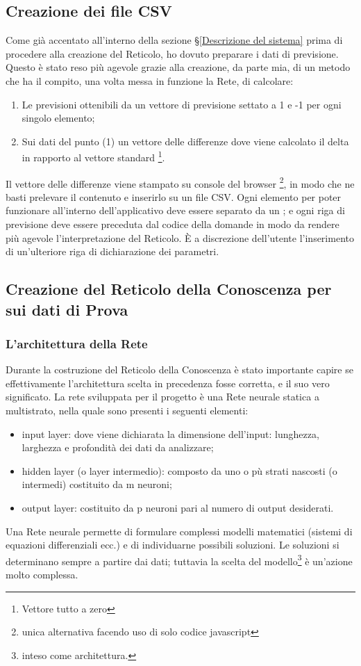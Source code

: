 \subsection{Creazione dei file CSV}
\label{Creazione dei file CSV}
Come gi\`a accentato all'interno della sezione §\ref{Descrizione del sistema} prima di procedere alla creazione del Reticolo, ho dovuto preparare i dati di previsione. Questo \`e stato reso pi\`u agevole grazie alla creazione, da parte mia, di un metodo che ha il compito, una volta messa in funzione la Rete, di calcolare:
\begin{enumerate}
\item Le previsioni ottenibili da un vettore di previsione settato a 1 e -1 per ogni singolo elemento;
\item Sui dati del punto (1) un vettore delle differenze dove viene calcolato il delta in rapporto al vettore standard \footnote{Vettore tutto a zero}.
\end{enumerate}
\noindent
Il vettore delle differenze viene stampato su console del browser \footnote{unica alternativa facendo uso di solo codice javascript}, in modo che ne basti prelevare il contenuto e inserirlo su un file CSV. Ogni elemento per poter funzionare all'interno dell'applicativo deve essere separato da un ; e ogni riga di previsione deve essere preceduta dal codice della domande in modo da rendere pi\`u agevole l'interpretazione del Reticolo. \`E a discrezione dell'utente l'inserimento di un'ulteriore riga di dichiarazione dei parametri.

\subsection{Creazione del Reticolo della Conoscenza per sui dati di Prova}
\label{Creazione del Reticolo della Conoscenza per sui dati di Prova}

\subsubsection{L'architettura della Rete}
\label{L'architettura della Rete}
Durante la costruzione del Reticolo della Conoscenza \`e stato importante capire se effettivamente l'architettura scelta in precedenza fosse corretta, e il suo vero significato. La rete sviluppata per il progetto \`e una Rete neurale statica a multistrato, nella quale sono presenti i seguenti elementi:
\begin{itemize}
\item input layer: dove viene dichiarata la dimensione dell'input: lunghezza, larghezza e profondit\`a dei dati da analizzare;
\item hidden layer (o layer intermedio): composto da uno o p\`u strati nascosti (o intermedi) costituito da m neuroni;
\item output layer:  costituito da p neuroni pari al numero di output desiderati.
\end{itemize}
\noindent 
Una Rete neurale permette di formulare complessi modelli matematici (sistemi di equazioni differenziali ecc.) e di individuarne possibili soluzioni. Le soluzioni si determinano sempre a partire dai dati; tuttavia la scelta del modello\footnote{inteso come architettura.} \`e un'azione molto complessa.

